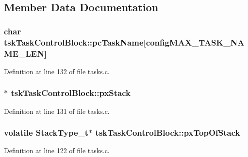 \subsection{Member Data Documentation}
\subsubsection[{\texorpdfstring{pc\+Task\+Name}{pcTaskName}}]{\setlength{\rightskip}{0pt plus 5cm}char tsk\+Task\+Control\+Block\+::pc\+Task\+Name\mbox{[}{\bf config\+M\+A\+X\+\_\+\+T\+A\+S\+K\+\_\+\+N\+A\+M\+E\+\_\+\+L\+EN}\mbox{]}}\hypertarget{structtsk_task_control_block_a67d61291794f38afb5be5132078bc24f}{}\label{structtsk_task_control_block_a67d61291794f38afb5be5132078bc24f}


Definition at line 132 of file tasks.\+c.

\subsubsection[{\texorpdfstring{px\+Stack}{pxStack}}]{$\ast$ tsk\+Task\+Control\+Block\+::px\+Stack}\hypertarget{structtsk_task_control_block_a9a0d71a9f95dd0609f9911d9efd79134}{}\label{structtsk_task_control_block_a9a0d71a9f95dd0609f9911d9efd79134}


Definition at line 131 of file tasks.\+c.

\subsubsection[{\texorpdfstring{px\+Top\+Of\+Stack}{pxTopOfStack}}]{\setlength{\rightskip}{0pt plus 5cm}volatile {\bf Stack\+Type\+\_\+t}$\ast$ tsk\+Task\+Control\+Block\+::px\+Top\+Of\+Stack}\hypertarget{structtsk_task_control_block_a429a186c7f8e34aba1eef5e12d215b90}{}\label{structtsk_task_control_block_a429a186c7f8e34aba1eef5e12d215b90}


Definition at line 122 of file tasks.\+c.

